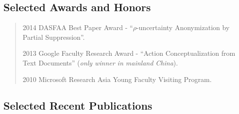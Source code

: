 \documentclass[10pt,a4paper]{article}
\begin{document}
\subsection*{Selected Awards and Honors}
\begin{quote}
2014 DASFAA Best Paper Award -
``$\rho$-uncertainty Anonymization by Partial Suppression''.

2013 Google Faculty Research Award - ``Action Conceptualization from Text Documents'' ({\em only winner in mainland China}).

%
%

2010 Microsoft Research Asia Young Faculty Visiting Program.

\end{quote}

\subsection*{Selected Recent Publications}
\end{document}

